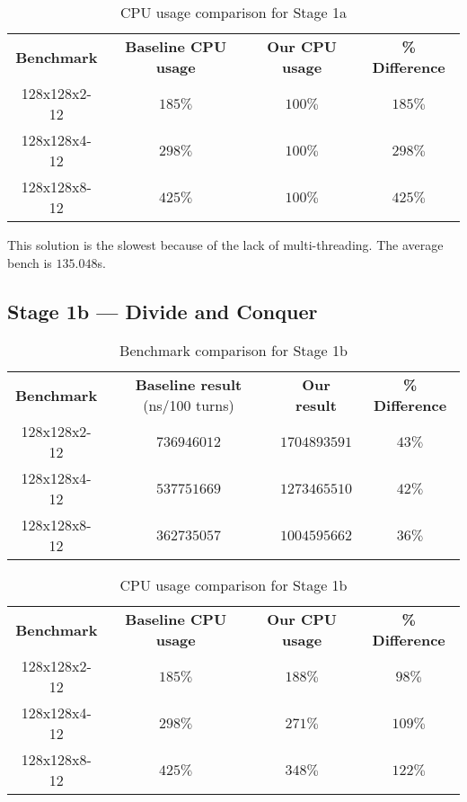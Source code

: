 \documentclass[10pt,a4paper,dvipsnames,cmyk]{scrartcl}
\begin{document}
\begin{table}[!htb]
\caption{CPU usage comparison for Stage 1a}
\begin{center}
    \begin{tabular}{|c|c|c|c|}
        \hline
        \textbf{Benchmark} & \textbf{Baseline CPU usage} &
        \textbf{Our CPU usage} & \textbf{\% Difference} \\ \hhline{|=|=|=|=|}
        128x128x2-12 & $185\%$ & $100\%$ & $185\%$ \\ \hline
        128x128x4-12 & $298\%$ & $100\%$ & $298\%$ \\ \hline
        128x128x8-12 & $425\%$ & $100\%$ & $425\%$ \\ \hline
    \end{tabular}
\end{center}
\end{table}



This solution is the slowest because of the lack of multi-threading. The
average bench is $135.048$s.

\subsection*{Stage 1b --- Divide and Conquer}%
\label{sub:divide-conquer}
\begin{table}[!htb]
\caption{Benchmark comparison for Stage 1b}
\begin{center}
    \begin{tabular}{|c|c|c|c|}
        \hline
        \textbf{Benchmark} & \textbf{Baseline result} (ns/100 turns) &
        \textbf{Our result} & \textbf{\% Difference} \\ \hhline{|=|=|=|=|}
        128x128x2-12 & $736946012$ & $1704893591$ & $43\%$ \\ \hline
        128x128x4-12 & $537751669$ & $1273465510$ & $42\%$ \\ \hline
        128x128x8-12 & $362735057$ & $1004595662$ & $36\%$ \\ \hline
    \end{tabular}
\end{center}
\end{table}
\begin{table}[!htb]
\caption{CPU usage comparison for Stage 1b}
\begin{center}
    \begin{tabular}{|c|c|c|c|}
        \hline
        \textbf{Benchmark} & \textbf{Baseline CPU usage} &
        \textbf{Our CPU usage} & \textbf{\% Difference} \\ \hhline{|=|=|=|=|}
        128x128x2-12 & $185\%$ & $188\%$ & $98\%$ \\ \hline
        128x128x4-12 & $298\%$ & $271\%$ & $109\%$ \\ \hline
        128x128x8-12 & $425\%$ & $348\%$ & $122\%$ \\ \hline
    \end{tabular}
\end{center}
\end{table}
\end{document}
